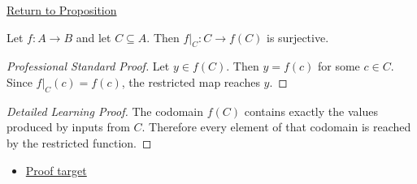 \newpage
{}
\label{prf:restricted-map-onto-image}

\begin{remark*}[Return]
\hyperref[prop:restricted-map-onto-image]{Return to Proposition}
\end{remark*}

\begin{proposition*}
Let $f:A\to B$ and let $C\subseteq A$. Then $f|_C:C\to f(C)$ is surjective.
\end{proposition*}

\begin{proof}[Professional Standard Proof]
\LRAProofBodyStart
Let $y\in f(C)$. Then $y=f(c)$ for some $c\in C$. Since
$f|_C(c)=f(c)$, the restricted map reaches $y$.
\end{proof}

\begin{proof}[Detailed Learning Proof]
\LRAProofBodyStart
The codomain $f(C)$ contains exactly the values produced by inputs from $C$.
Therefore every element of that codomain is reached by the restricted function.
\end{proof}
\begin{remark*}
\end{remark*}



\begin{dependencies}
\begin{itemize}
  \item \hyperref[prop:restricted-map-onto-image]{Proof target}
\end{itemize}
\end{dependencies}

\clearpage

